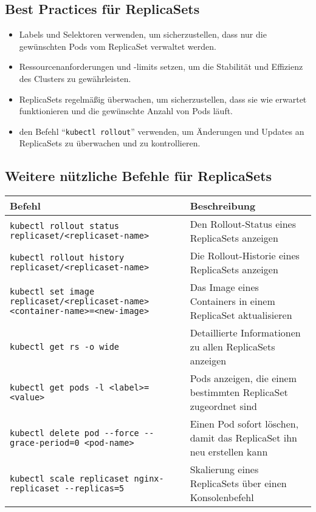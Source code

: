 \subsection{Best Practices für ReplicaSets}
\begin{itemize}
    \item Labels und Selektoren verwenden, um sicherzustellen, dass nur die gewünschten Pods vom ReplicaSet verwaltet werden.
    \item Ressourcenanforderungen und -limits setzen, um die Stabilität und Effizienz des Clusters zu gewährleisten.
    \item ReplicaSets regelmäßig überwachen, um sicherzustellen, dass sie wie erwartet funktionieren und die gewünschte Anzahl von Pods läuft.
    \item den Befehl \enquote{\texttt{kubectl rollout}} verwenden, um Änderungen und Updates an ReplicaSets zu überwachen und zu kontrollieren.
\end{itemize}

\subsection{Weitere nützliche Befehle für ReplicaSets}
\begin{tabular}{|p{}|p{}|}
\hline
\textbf{Befehl} & \textbf{Beschreibung} \\
\hline
\texttt{kubectl rollout status replicaset/<replicaset-name>} & Den Rollout-Status eines ReplicaSets anzeigen \\
\texttt{kubectl rollout history replicaset/<replicaset-name>} & Die Rollout-Historie eines ReplicaSets anzeigen \\
\texttt{kubectl set image replicaset/<replicaset-name> <container-name>=<new-image>} & Das Image eines Containers in einem ReplicaSet aktualisieren \\
\texttt{kubectl get rs -o wide} & Detaillierte Informationen zu allen ReplicaSets anzeigen \\
\texttt{kubectl get pods -l <label>=<value>} & Pods anzeigen, die einem bestimmten ReplicaSet zugeordnet sind \\
\texttt{kubectl delete pod {-}{-}force {-}{-}grace-period=0 <pod-name>} & Einen Pod sofort löschen, damit das ReplicaSet ihn neu erstellen kann \\
\texttt{kubectl scale replicaset nginx-replicaset {-}{-}replicas=5} & Skalierung eines ReplicaSets über einen Konsolenbefehl\\
\hline
\end{tabular}
